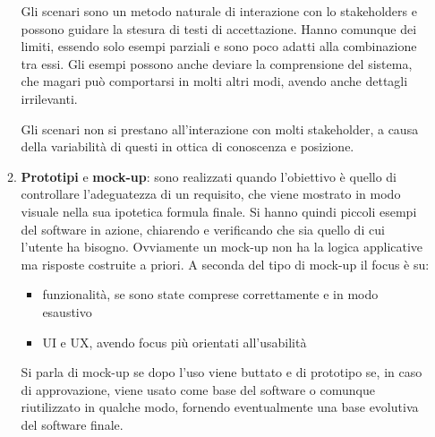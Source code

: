 \begin{itemize}
\begin{enumerate}
        Gli scenari sono un metodo naturale di interazione con lo stakeholders e possono guidare la stesura di testi di accettazione. Hanno comunque dei limiti, essendo solo esempi parziali e sono poco adatti alla combinazione tra essi. Gli esempi possono anche deviare la comprensione del sistema, che magari può comportarsi in molti altri modi, avendo anche dettagli irrilevanti.
        
        Gli scenari non si prestano all'interazione con molti stakeholder, a causa della variabilità di questi in ottica di conoscenza e posizione.
        \item \textbf{Prototipi} e \textbf{mock-up}: sono realizzati quando l'obiettivo è quello di controllare l'adeguatezza di un requisito, che viene mostrato in modo visuale nella sua ipotetica formula finale. Si hanno quindi piccoli esempi del software in azione, chiarendo e verificando che sia quello di cui l'utente ha bisogno. Ovviamente un mock-up non ha la logica applicative ma risposte costruite a priori. A seconda del tipo di mock-up il focus è su:
        \begin{itemize}
            \item funzionalità, se sono state comprese correttamente e in modo esaustivo
            \item UI e UX, avendo focus più orientati all'usabilità
        \end{itemize}
        Si parla di mock-up se dopo l'uso viene buttato e di prototipo se, in caso di approvazione, viene usato come base del software o comunque riutilizzato in qualche modo, fornendo eventualmente una base evolutiva del software finale.


\end{enumerate}
\end{itemize}
